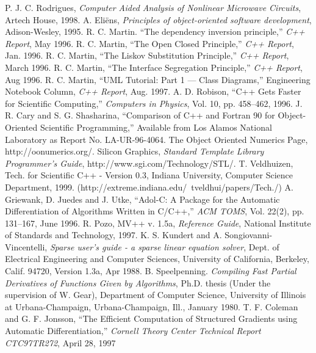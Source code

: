 \begin{thebibliography}{99}
 P. J. C. Rodrigues, \emph{Computer Aided Analysis
of Nonlinear Microwave Circuits}, Artech House, 1998.
%
 A. Eli\"ens, \emph{Principles of object-oriented
software development}, Adison-Wesley, 1995.
%
 R. C. Martin. ``The dependency inversion principle,''
\emph{C++ Report}, May 1996.
%
 R. C. Martin, ``The Open Closed Principle,'' \emph{C++
Report}, Jan. 1996.
%
 R. C. Martin, ``The Liskov Substitution Principle,''
\emph{C++ Report}, March 1996.
%
 R. C. Martin, ``The Interface Segregation Principle,''
\emph{C++ Report}, Aug 1996.
%
 R. C. Martin, ``UML Tutorial: Part 1 --- Class
Diagrams,'' Engineering Notebook Column, \emph{C++ Report}, Aug. 1997.
%
 A. D. Robison, ``C++ Gets Faster for Scientific
Computing,'' \emph{Computers in Physics}, Vol. 10, pp. 458--462, 1996.
%
 J. R. Cary and S. G. Shasharina, ``Comparison of
C++ and Fortran 90 for Object-Oriented Scientific Programming,''
Available from Los Alamos National Laboratory as Report
No. LA-UR-96-4064.
%
 The Object Oriented Numerics Page,
http://oonumerics.org/.
%
 Silicon Graphics, \emph{Standard Template Library
Programmer's Guide}, http://www.sgi.com/Technology/STL/.
%
 T. Veldhuizen, {Tech. for Scientific C++ - Version
0.3}, Indiana University, Computer Science Department,
1999. (http://extreme.indiana.edu/~tveldhui/papers/Tech./)
%
 A. Griewank, D. Juedes and J. Utke, ``Adol-C: A
Package for the Automatic Differentiation of Algorithms Written in
C/C++,'' \emph{ACM TOMS}, Vol. 22(2), pp. 131--167, June 1996.
%
 R. Pozo, {MV++ v. 1.5a}, \emph{Reference Guide}, National
Institute of Standards and Technology, 1997.
%
 K. S. Kundert and A. Songiovanni-Vincentelli,
\emph{Sparse user's guide - a sparse linear equation solver}, Dept. of
Electrical Engineering and Computer Sciences, University of
California, Berkeley, Calif. 94720, Version 1.3a, Apr 1988.
%
 B. Speelpenning. \emph{Compiling Fast Partial
Derivatives of Functions Given by Algorithms}, Ph.D. thesis (Under the
supervision of W. Gear), Department of Computer Science, University of
Illinois at Urbana-Champaign, Urbana-Champaign, Ill., January 1980.
%
 T. F. Coleman and G. F. Jonsson, ``The Efficient
Computation of Structured Gradients using Automatic Differentiation,''
\emph{Cornell Theory Center Technical Report CTC97TR272}, April 28,
1997


\end{thebibliography}
